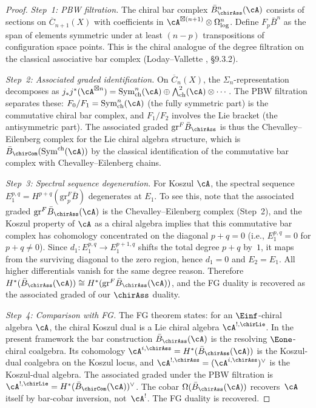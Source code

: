 \begin{proof}
\emph{Step~1: PBW filtration.}
The chiral bar complex $\bar{B}^n_{\chirAss}(\cA)$ consists of sections on $\overline{C}_{n+1}(X)$ with coefficients in $\cA^{\boxtimes(n+1)} \otimes \Omega^n_{\log}$. Define $F_p \bar{B}^n$ as the span of elements symmetric under at least $(n-p)$ transpositions of configuration space points. This is the chiral analogue of the degree filtration on the classical associative bar complex (Loday--Vallette \cite{LV12}, \S9.3.2).

\emph{Step~2: Associated graded identification.}
On $\overline{C}_n(X)$, the $\Sigma_n$-representation decomposes as $j_*j^*(\cA^{\boxtimes n}) = \mathrm{Sym}^n_{\mathrm{ch}}(\cA) \oplus \bigwedge^2_{\mathrm{ch}}(\cA) \otimes \cdots$. The PBW filtration separates these: $F_0/F_1 = \mathrm{Sym}^n_{\mathrm{ch}}(\cA)$ (the fully symmetric part) is the commutative chiral bar complex, and $F_1/F_2$ involves the Lie bracket (the antisymmetric part). The associated graded $\mathrm{gr}^F \bar{B}_{\chirAss}$ is thus the Chevalley--Eilenberg complex for the Lie chiral algebra structure, which is $\bar{B}_{\chirCom}(\mathrm{Sym}^{\mathrm{ch}}(\cA))$ by the classical identification of the commutative bar complex with Chevalley--Eilenberg chains.

\emph{Step~3: Spectral sequence degeneration.}
For Koszul $\cA$, the spectral sequence $E_1^{p,q} = H^{p+q}(\mathrm{gr}^F_p \bar{B})$ degenerates at $E_1$. To see this, note that the associated graded $\mathrm{gr}^F \bar{B}_{\chirAss}(\cA)$ is the Chevalley--Eilenberg complex (Step~2), and the Koszul property of $\cA$ as a chiral algebra implies that this commutative bar complex has cohomology concentrated on the diagonal $p + q = 0$ (i.e., $E_1^{p,q} = 0$ for $p + q \neq 0$). Since $d_1\colon E_1^{p,q} \to E_1^{p+1,q}$ shifts the total degree $p+q$ by~$1$, it maps from the surviving diagonal to the zero region, hence $d_1 = 0$ and $E_2 = E_1$. All higher differentials vanish for the same degree reason. Therefore $H^*(\bar{B}_{\chirAss}(\cA)) \cong H^*(\mathrm{gr}^F \bar{B}_{\chirAss}(\cA))$, and the FG duality is recovered as the associated graded of our $\chirAss$ duality.

\emph{Step~4: Comparison with FG.}
The FG theorem states: for an $\Einf$-chiral algebra $\cA$, the
chiral Koszul dual is a Lie chiral algebra
$\cA^{!,\chirLie}$. In the present framework the bar construction
$\bar{B}_{\chirAss}(\cA)$ is the resolving $\Eone$-chiral coalgebra.
Its cohomology
$\cA^{i,\chirAss}=H^*(\bar{B}_{\chirAss}(\cA))$ is the
Koszul-dual coalgebra on the Koszul locus, and
$\cA^{!,\chirAss}=(\cA^{i,\chirAss})^\vee$ is the
Koszul-dual algebra. The associated graded under the PBW filtration
is
$\cA^{!,\chirLie}=
H^*(\bar{B}_{\chirCom}(\cA))^\vee$.
The cobar
$\Omega(\bar{B}_{\chirAss}(\cA))$ recovers~$\cA$ itself by
bar-cobar inversion, not~$\cA^!$. The FG duality is recovered.
\end{proof}

